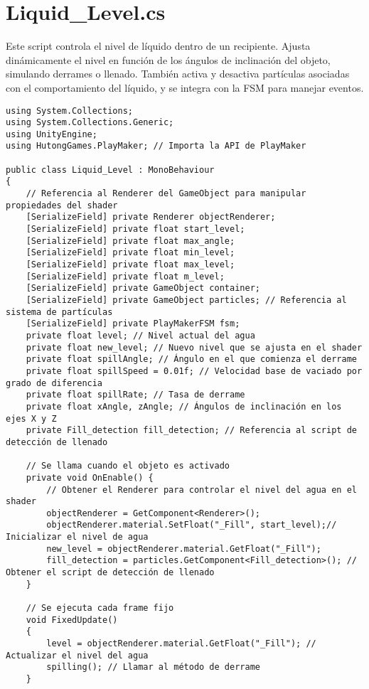\section{Liquid\_Level.cs}\label{script:Liquid_Level}
Este script controla el nivel de líquido dentro de un recipiente. Ajusta dinámicamente el nivel en función de los ángulos de inclinación del objeto, simulando derrames o llenado. También activa y desactiva partículas asociadas con el comportamiento del líquido, y se integra con la FSM para manejar eventos.
\begin{verbatim}
using System.Collections;
using System.Collections.Generic;
using UnityEngine;
using HutongGames.PlayMaker; // Importa la API de PlayMaker

public class Liquid_Level : MonoBehaviour
{
    // Referencia al Renderer del GameObject para manipular propiedades del shader
    [SerializeField] private Renderer objectRenderer;
    [SerializeField] private float start_level;
    [SerializeField] private float max_angle;
    [SerializeField] private float min_level;
    [SerializeField] private float max_level;
    [SerializeField] private float m_level;
    [SerializeField] private GameObject container;
    [SerializeField] private GameObject particles; // Referencia al sistema de partículas
    [SerializeField] private PlayMakerFSM fsm;
    private float level; // Nivel actual del agua
    private float new_level; // Nuevo nivel que se ajusta en el shader
    private float spillAngle; // Ángulo en el que comienza el derrame
    private float spillSpeed = 0.01f; // Velocidad base de vaciado por grado de diferencia
    private float spillRate; // Tasa de derrame
    private float xAngle, zAngle; // Ángulos de inclinación en los ejes X y Z
    private Fill_detection fill_detection; // Referencia al script de detección de llenado

    // Se llama cuando el objeto es activado
    private void OnEnable() {
        // Obtener el Renderer para controlar el nivel del agua en el shader
        objectRenderer = GetComponent<Renderer>();
        objectRenderer.material.SetFloat("_Fill", start_level);// Inicializar el nivel de agua
        new_level = objectRenderer.material.GetFloat("_Fill"); 
        fill_detection = particles.GetComponent<Fill_detection>(); // Obtener el script de detección de llenado
    }

    // Se ejecuta cada frame fijo
    void FixedUpdate()
    {
        level = objectRenderer.material.GetFloat("_Fill"); // Actualizar el nivel del agua
        spilling(); // Llamar al método de derrame
    }
 

\end{verbatim}
